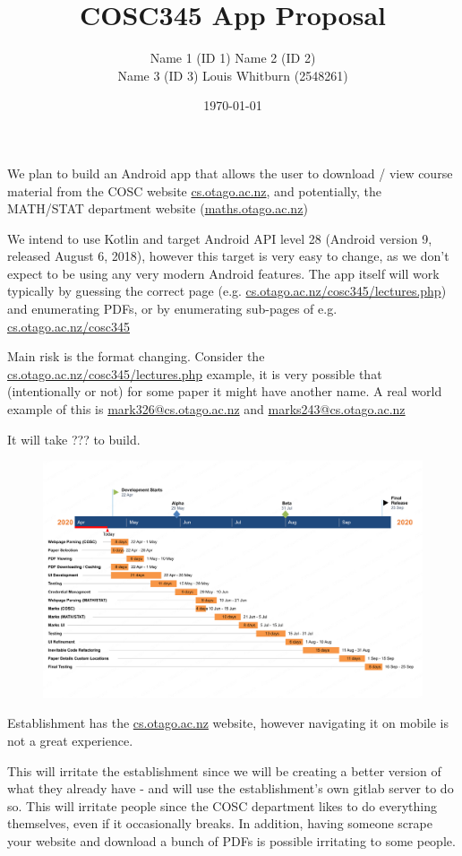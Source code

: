 \documentclass{article}
\title{COSC345 App Proposal}
\author{Name 1 (ID 1) Name 2 (ID 2) \\ Name 3 (ID 3) Louis Whitburn (2548261)}
\date{\today}
\begin{document}
	\maketitle
	
	We plan to build an Android app that allows the user to download / view course material from the COSC website \url{cs.otago.ac.nz}, and potentially, the MATH/STAT department website (\url{maths.otago.ac.nz})
	
	We intend to use Kotlin and target Android API level 28 (Android version 9, released August 6, 2018), however this target is very easy to change, as we don't expect to be using any very modern Android features. The app itself will work typically by guessing the correct page (e.g. \url{cs.otago.ac.nz/cosc345/lectures.php}) and enumerating PDFs, or by enumerating sub-pages of e.g. \url{cs.otago.ac.nz/cosc345}
	
	Main risk is the format changing. Consider the \url{cs.otago.ac.nz/cosc345/lectures.php} example, it is very possible that (intentionally or not) for some paper it might have another name. A real world example of this is \url{mark326@cs.otago.ac.nz} and \url{marks243@cs.otago.ac.nz}
	
	It will take ??? to build.
	
	\begin{figure}[h!]
		\centering
		\includegraphics[width=\linewidth]{chart.png}
	\end{figure}
	
	Establishment has the \url{cs.otago.ac.nz} website, however navigating it on mobile is not a great experience.
	
	This will irritate the establishment since we will be creating a better version of what they already have - and will use the establishment's own gitlab server to do so. This will irritate people since the COSC department likes to do everything themselves, even if it occasionally breaks. In addition, having someone scrape your website and download a bunch of PDFs is possible irritating to some people.
\end{document}
